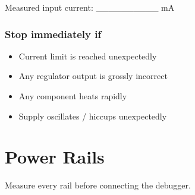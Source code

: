 \documentclass[10pt,a4paper,oneside]{report}
\providecommand{\tightlist}{\setlength{\itemsep}{1pt}\setlength{\parskip}{1pt}}
\begin{document}
Measured input current: \_\_\_\_\_\_\_\_\_\_ mA

\subsubsection{Stop immediately if}\label{wiki-hardware-bring-up-and-testing--stop-immediately-if}

\begin{itemize}
\tightlist
\item[$\square$]
  Current limit is reached unexpectedly
\item[$\square$]
  Any regulator output is grossly incorrect
\item[$\square$]
  Any component heats rapidly
\item[$\square$]
  Supply oscillates / hiccups unexpectedly
\end{itemize}

\section{Power Rails}\label{wiki-hardware-bring-up-and-testing--3-power-rails}

Measure every rail before connecting the debugger.
\end{document}
